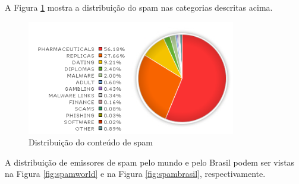\documentclass[a4paper,dvipdfm]{article}
\begin{document}
		A Figura \ref{fig:spamtype} mostra a distribuição do spam nas categorias descritas acima.

		\begin{figure}
			\centering
			\includegraphics [height=5cm] {Imagens/m86security/spamtype.png}
			\caption {Distribuição do conteúdo de spam}
			\label{fig:spamtype}
		\end{figure}

		A distribuição de emissores de spam pelo mundo e pelo Brasil podem ser vistas na Figura \ref{fig:spamworld} e na Figura \ref{fig:spambrasil}, respectivamente.
\end{document}
